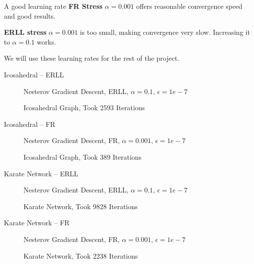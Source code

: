 \documentclass{beamer}
\begin{document}
\begin{frame}{A good learning rate}
    \textbf{FR Stress}
    $\alpha=0.001$ offers reasonable convergence speed and good results.

\textbf{ERLL stress}
$\alpha=0.001$ is too small, making convergence very slow.
Increasing it to $\alpha=0.1$ works.

We will use these learning rates for the rest of the project.
\end{frame}

\begin{frame}{Icosahedral -- ERLL}
    \begin{figure}[H]
    \centering
    Nesterov Gradient Descent, ERLL, $\alpha=0.1$, $\epsilon=1e-7$
    
    \caption{\label{icosahedral-nesterov-erll} Icosahedral Graph, Took 2593 Iterations}
    \end{figure}
\end{frame}

\begin{frame}{Icosahedral -- FR}
    \begin{figure}[H]
    \centering
    Nesterov Gradient Descent, FR, $\alpha=0.001$, $\epsilon=1e-7$
    
    \caption{\label{icosahedral-nesterov-fr} Icosahedral Graph, Took 389 Iterations}
    \end{figure}
\end{frame}

\begin{frame}{Karate Network -- ERLL}
    \begin{figure}[H]
    \centering
    Nesterov Gradient Descent, ERLL, $\alpha=0.1$, $\epsilon=1e-7$
    
    \caption{\label{karate-nesterov-erll} Karate Network, Took 9828 Iterations}
    \end{figure}
\end{frame}

\begin{frame}{Karate Network -- FR}
    \begin{figure}[H]
    \centering
    Nesterov Gradient Descent, FR, $\alpha=0.001$, $\epsilon=1e-7$
    
    \caption{\label{karate-nesterov-fr} Karate Network, Took 2238 Iterations}
    \end{figure}
\end{frame}
\end{document}
